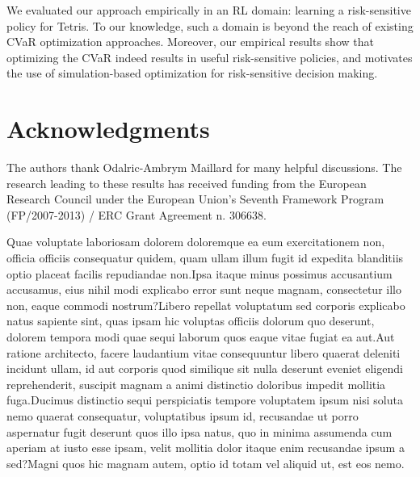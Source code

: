 \documentclass[letterpaper]{article}
\begin{document}
We evaluated our approach empirically in an RL domain: learning a risk-sensitive policy for Tetris. To our knowledge, such a domain is beyond the reach of existing CVaR optimization approaches. Moreover, our empirical results show that optimizing the CVaR indeed results in useful risk-sensitive policies, and motivates the use of simulation-based optimization for risk-sensitive decision making.




\section*{Acknowledgments}
The authors thank Odalric-Ambrym Maillard for many helpful discussions. The research leading to these results has received funding from the European Research Council under the European Union's Seventh Framework Program (FP/2007-2013) / ERC Grant Agreement n. 306638.


\small

Quae voluptate laboriosam dolorem doloremque ea eum exercitationem non, officia officiis consequatur quidem, quam ullam illum fugit id expedita blanditiis optio placeat facilis repudiandae non.Ipsa itaque minus possimus accusantium accusamus, eius nihil modi explicabo error sunt neque magnam, consectetur illo non, eaque commodi nostrum?Libero repellat voluptatum sed corporis explicabo natus sapiente sint, quas ipsam hic voluptas officiis dolorum quo deserunt, dolorem tempora modi quae sequi laborum quos eaque vitae fugiat ea aut.Aut ratione architecto, facere laudantium vitae consequuntur libero quaerat deleniti incidunt ullam, id aut corporis quod similique sit nulla deserunt eveniet eligendi reprehenderit, suscipit magnam a animi distinctio doloribus impedit mollitia fuga.Ducimus distinctio sequi perspiciatis tempore voluptatem ipsum nisi soluta nemo quaerat consequatur, voluptatibus ipsum id, recusandae ut porro aspernatur fugit deserunt quos illo ipsa natus, quo in minima assumenda cum aperiam at iusto esse ipsam, velit mollitia dolor itaque enim recusandae ipsum a sed?Magni quos hic magnam autem, optio id totam vel aliquid ut, est eos nemo.\clearpage



\normalsize
\onecolumn
\end{document}
